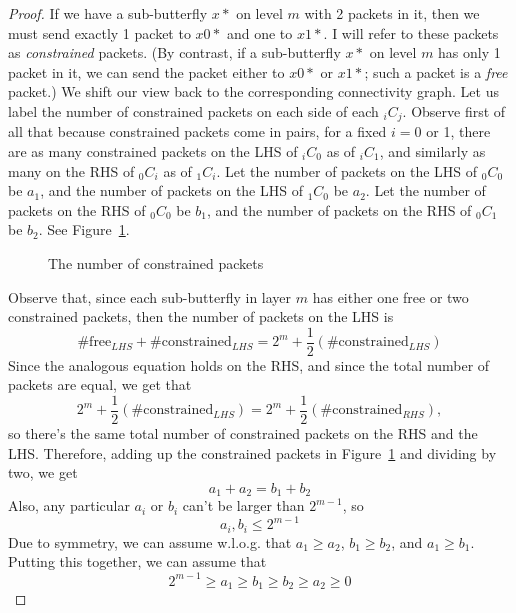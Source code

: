 \documentclass[12pt]{article}
\begin{document}
\begin{proof}
If we have a sub-butterfly $x*$ on level $m$ with 2 packets in it, then 
we must send exactly 1 packet to $x0*$ and one to 
$x1*$.  I will refer to these packets as \emph{constrained} packets.  
(By contrast, if a sub-butterfly $x*$ on level $m$ has only 1 packet in it,
we can send the packet either to $x0*$ or $x1*$; such a packet is 
a \emph{free} packet.)  We shift our view back to the corresponding
connectivity graph.
Let us label the number of constrained packets on each side of each 
$_{i}C_{j}$.
Observe first of all that because constrained packets come in pairs,
for a fixed $i=0$ or 1, there are as many constrained
packets on the LHS of $_{i}C_{0}$ as of $_{i}C_{1}$, and similarly
as many on the RHS of $_{0}C_{i}$ as of $_{1}C_{i}$.  
Let the number of packets on the LHS of
$_{0}C_{0}$ be $a_{1}$, and the number of packets on the LHS of $_{1}C_{0}$
 be $a_{2}$.
Let the number of packets on the RHS of 
$_{0}C_{0}$ be $b_{1}$, and the number of packets on the RHS of $_{0}C_{1}$
 be $b_{2}$.
See Figure~\ref{constrained}. 
\begin{figure}[ht] 
\centerline{ \hspace{.2in}  } 
\caption{The number of constrained packets} 
\label{constrained}
\end{figure}

Observe that, since each sub-butterfly in layer $m$ has
either one free or two constrained packets, then the number of
packets on the LHS is 
\[\# \mbox{free}_{LHS} + \# \mbox{constrained}_{LHS}=
2^{m}+\frac{1}{2}(\# \mbox{constrained}_{LHS})\]
Since the analogous
equation holds on the RHS, and since the total number of packets are equal,
we get that 
\[2^{m}+\frac{1}{2}(\# \mbox{constrained}_{LHS})=
2^{m}+\frac{1}{2}(\# \mbox{constrained}_{RHS}),\]
so there's the same total number of constrained
packets on the RHS and the LHS.  Therefore, adding up the 
constrained packets in Figure~\ref{constrained} and dividing by two, we get
\[a_{1} + a_{2}=b_{1}+b_{2}\]
Also, any particular $a_{i}$ or $b_{i}$ can't be larger than 
$2^{m-1}$, so 
\[a_{i}, b_{i} \leq 2^{m-1}\]
Due to symmetry, we can assume w.l.o.g. that $a_{1}\geq a_{2}$,
$b_{1} \geq b_{2}$, and $a_{1}\geq b_{1}$.  Putting this together,
we can assume that
\[2^{m-1}\geq a_{1} \geq b_{1} \geq b_{2} \geq a_{2} \geq 0\]


\end{proof}
\end{document}
